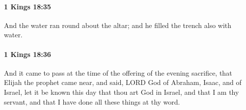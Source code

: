 		\paragraph{1 Kings 18:35} %
			\label{1KINGS-18-35}

			And the water ran round about the altar; and he filled the trench also with water.


		\paragraph{1 Kings 18:36} %
			\label{1KINGS-18-36}

			And it came to pass at the time of the offering of the evening sacrifice, that Elijah the prophet came near, and said, LORD God of Abraham, Isaac, and of Israel, let it be known this day that thou art God in Israel, and that I am thy servant, and that I have done all these things at thy word.

